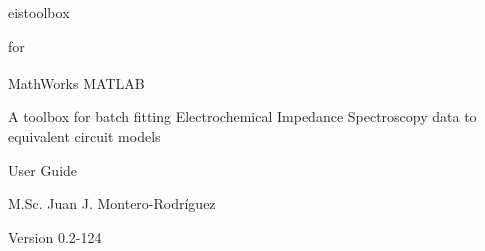 \documentclass[10pt,b5paper,oneside]{book}
\begin{document}
\setlength{\parindent}{0pt}
\setlength{\parskip}{6pt}

\frontmatter

\begin{titlepage}


\begin{center}
	\Large eistoolbox \par
\end{center}
\begin{center}
	\large for \par
\end{center}
\begin{center}
	\Large MathWorks\textsuperscript{\textregistered} MATLAB \par
\end{center}

\vspace*{2cm}

\begin{center}
	\large A toolbox for batch fitting Electrochemical Impedance Spectroscopy data to equivalent circuit models
\end{center} 

\vspace*{2cm}

\begin{center}
	\Large User Guide \par
\end{center}
\begin{center}
	\large M.Sc. Juan J. Montero-Rodríguez \par
\end{center}

\vspace*{2cm}

\begin{center}
	\Large Version 0.2-124
\end{center}

\end{titlepage}

\clearpage

\tableofcontents

\mainmatter
\pagestyle{mmatter}
\end{document}

